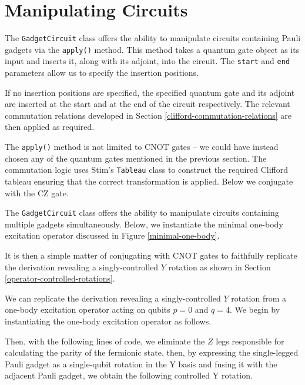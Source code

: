 \section{Manipulating Circuits}%
\label{manipulating-circuits}

The \lstinline{GadgetCircuit} class offers the ability to manipulate circuits containing Pauli gadgets via the \lstinline{apply()} method. This method takes a quantum gate object as its input and inserts it, along with its adjoint, into the circuit. The \lstinline{start} and \lstinline{end} parameters allow us to specify the insertion positions.


If no insertion positions are specified, the specified quantum gate and its adjoint are inserted at the start and at the end of the circuit respectively. The relevant commutation relations developed in Section \ref{clifford-commutation-relations} are then applied as required.


The \lstinline{apply()} method is not limited to CNOT gates -- we could have instead chosen any of the quantum gates mentioned in the previous section. The commutation logic uses Stim's \lstinline{Tableau} class to construct the required Clifford tableau ensuring that the correct transformation is applied. Below we conjugate with the CZ gate.


The \lstinline{GadgetCircuit} class offers the ability to manipulate circuits containing multiple gadgets simultaneously. Below, we instantiate the minimal one-body excitation operator discussed in Figure \ref{minimal-one-body}.


It is then a simple matter of conjugating with CNOT gates to faithfully replicate the derivation revealing a singly-controlled $Y$ rotation as shown in Section \ref{operator-controlled-rotations}.


We can replicate the derivation revealing a singly-controlled $Y$ rotation from a one-body excitation operator acting on qubits $p=0$ and $q=4$. We begin by instantiating the one-body excitation operator as follows.


Then, with the following lines of code, we eliminate the $Z$ legs responsible for calculating the parity of the fermionic state, then, by expressing the single-legged Pauli gadget as a single-qubit rotation in the Y basis and fusing it with the adjacent Pauli gadget, we obtain the following controlled Y rotation.

